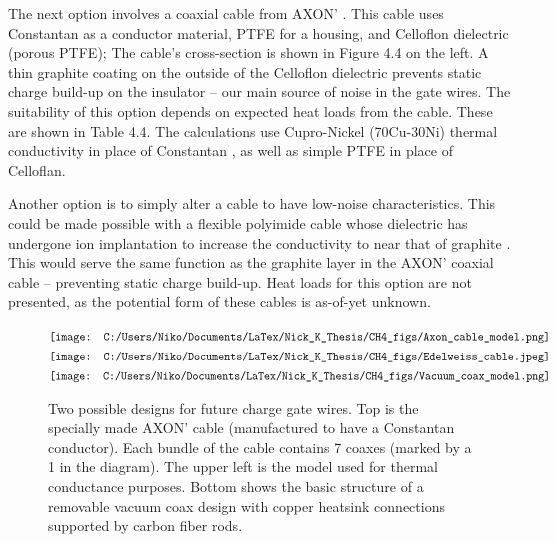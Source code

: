 \documentclass{report}
\begin{document}
The next option involves a coaxial cable from AXON' \footnotemark.
This cable uses Constantan as a conductor material, PTFE for a housing, and Celloflon dielectric (porous PTFE); The cable's cross-section is shown in Figure 4.4 on the left. A thin graphite coating on the outside of the Celloflon dielectric prevents static charge build-up on the insulator -- our main source of noise in the gate wires. The suitability of this option depends on expected heat loads from the cable. These are shown in Table 4.4. The calculations use Cupro-Nickel (70Cu-30Ni) thermal conductivity in place of Constantan \footnotemark, as well as simple PTFE in place of Celloflan.


Another option is to simply alter a cable to have low-noise characteristics. This could be made possible with a flexible polyimide cable whose dielectric has undergone ion implantation to increase the conductivity to near that of graphite \footnotemark. This would serve the same function as the graphite layer in the AXON' coaxial cable -- preventing static charge build-up. Heat loads for this option are not presented, as the potential form of these cables is as-of-yet unknown.


\begin{figure}[h]
\centering
$\vcenter{\hbox{\texttt{[image: C:/Users/Niko/Documents/LaTex/Nick\_K\_Thesis/CH4\_figs/Axon\_cable\_model.png]}}}$
$\vcenter{\hbox{\texttt{[image: C:/Users/Niko/Documents/LaTex/Nick\_K\_Thesis/CH4\_figs/Edelweiss\_cable.jpeg]}}}$
$\vcenter{\hbox{\texttt{[image: C:/Users/Niko/Documents/LaTex/Nick\_K\_Thesis/CH4\_figs/Vacuum\_coax\_model.png]}}}$
\caption{Two possible designs for future charge gate wires. Top is the specially made AXON' cable (manufactured to have a Constantan conductor). Each bundle of the cable contains 7 coaxes (marked by a 1 in the diagram). The upper left is the model used for thermal conductance purposes. Bottom shows the basic structure of a removable vacuum coax design with copper heatsink connections supported by carbon fiber rods.}
\end{figure}
\end{document}

